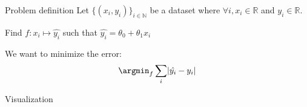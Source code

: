 \begin{frame}{Problem definition}
  Let  $\{(x_i, y_i)\}_{i \in \mathbb{N}}$ be a dataset where $\forall i, x_i \in \mathbb{R}$ and $y_i \in \mathbb{R}$.

  Find $f: x_i \mapsto \hat{y_i}$ such that $\hat{y_i} = \theta_0 + \theta_1 x_i$

  We want to minimize the error:
  \[
    \argmin_f \sum_i \lvert \hat{y_i} - y_i \rvert
  \]
\end{frame}

\begin{frame}{Visualization}
\end{frame}